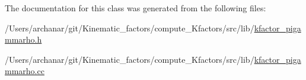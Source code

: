The documentation for this class was generated from the following files\+:\begin{DoxyCompactItemize}
\item 
/\+Users/archanar/git/\+Kinematic\+\_\+factors/compute\+\_\+\+Kfactors/src/lib/\mbox{\hyperlink{kfactor__pigammarho_8h}{kfactor\+\_\+pigammarho.\+h}}\item 
/\+Users/archanar/git/\+Kinematic\+\_\+factors/compute\+\_\+\+Kfactors/src/lib/\mbox{\hyperlink{kfactor__pigammarho_8cc}{kfactor\+\_\+pigammarho.\+cc}}\end{DoxyCompactItemize}
